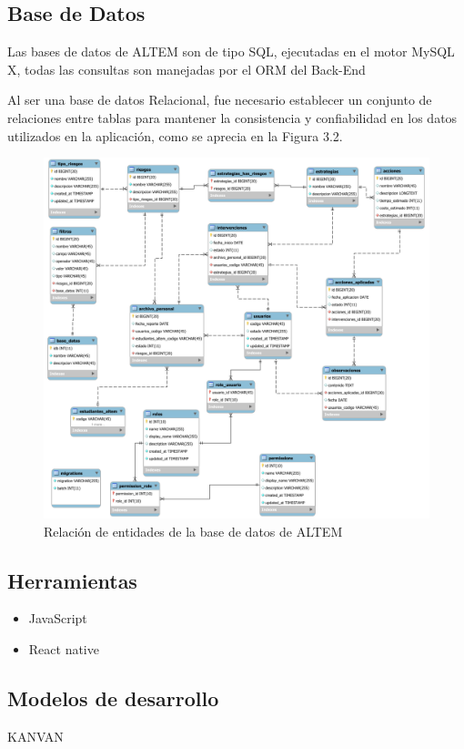 \subsection{Base de Datos}
Las bases de datos de ALTEM son de tipo SQL, ejecutadas en el motor MySQL X, todas las consultas son manejadas por el ORM del Back-End

Al ser una base de datos Relacional, fue necesario establecer un conjunto de relaciones entre tablas para mantener la consistencia y confiabilidad en los datos utilizados en la aplicación, como se aprecia en la Figura 3.2.

\begin{figure}[h]
    \centering
    \includegraphics[width=1\textwidth]{img/EER.png}
    \caption{Relación de entidades de la base de datos de  ALTEM}
\end{figure}

\subsection{Herramientas}
    \begin{itemize}
         \item JavaScript
         \item React native
    \end{itemize}
 \subsection{Modelos de desarrollo}
     KANVAN

